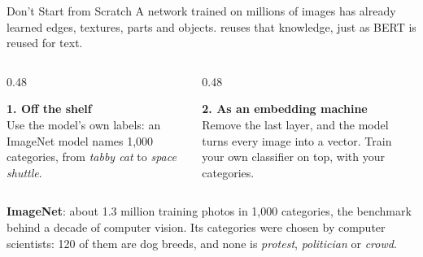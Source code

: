 \newcommand{\coursemodule}{Module 06}





\begin{frame}{Don't Start from Scratch}
A network trained on millions of images has already learned edges, textures, parts and objects.
 reuses that knowledge, just as BERT is reused for text.

\vspace{0.25cm}
\begin{columns}[T]
\begin{column}{0.48\textwidth}
\begin{greenbox}
\textbf{1. Off the shelf}\\
Use the model's own labels: an ImageNet model names 1,000 categories, from \emph{tabby cat} to
\emph{space shuttle}.
\end{greenbox}
\end{column}
\begin{column}{0.48\textwidth}
\begin{greenbox}
\textbf{2. As an embedding machine}\\
Remove the last layer, and the model turns every image into a vector. Train your own classifier
on top, with your categories.
\end{greenbox}
\end{column}
\end{columns}

\vspace{0.2cm}
\begin{graybox}
\textbf{ImageNet}: about 1.3 million training photos in 1,000 categories, the benchmark behind a
decade of computer vision. Its categories were chosen by computer scientists: 120 of them are dog
breeds, and none is \emph{protest}, \emph{politician} or \emph{crowd}.
\end{graybox}
\end{frame}

